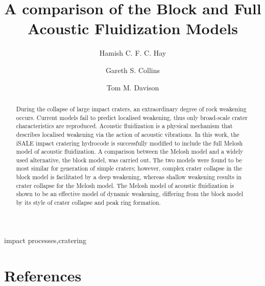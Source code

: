 \documentclass[preprint,3p,twocolumn,times,authoryear]{elsarticle}
\begin{document}
\begin{frontmatter}

\title{A comparison of the Block and Full Acoustic Fluidization Models}

\author[label1]{Hamish C. F. C. Hay}
\author[label2]{Gareth S. Collins}
\author[label2]{Tom M. Davison}
\address[label1]{Lunar and Planetary Laboratory, University of Arizona, Tucson, AZ 85719, United States}
\address[label2]{Impacts and Astromaterials Research Centre, Department of Earth Science and Engineering, Imperial College London, London, SW7 2BP, United Kingdom}

\begin{keyword}
impact processes\sep cratering
\end{keyword}

\begin{abstract}

\noindent During the collapse of large impact craters, an extraordinary degree of rock weakening occurs. Current models fail to predict localised weakening, thus only broad-scale crater characteristics are reproduced. Acoustic fluidization is a physical mechanism that describes localised weakening via the action of acoustic vibrations. In this work, the iSALE impact cratering hydrocode is successfully modified to include the full Melosh model of acoustic fluidization. A comparison between the Melosh model and a widely used alternative, the block model, was carried out. The two models were found to be most similar for generation of simple craters; however, complex crater collapse in the block model is facilitated  by a deep weakening, whereas shallow weakening results in crater collapse for the Melosh model. The Melosh model of acoustic fluidization is shown to be an effective model of dynamic weakening, differing from the block model by its style of crater collapse and peak ring formation.

\end{abstract}
\end{frontmatter}











\section*{References}



\end{document}
